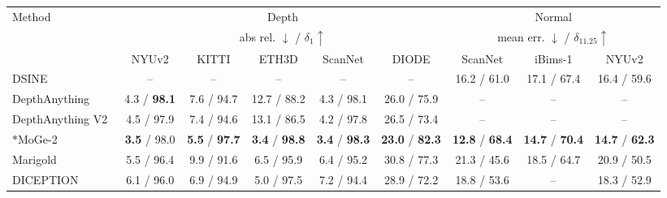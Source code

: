 \begin{table}[t]
    \centering
    \small
    \setlength{\tabcolsep}{3pt}
    \begin{tabular}{l|ccccc|ccc}
        \toprule
        \multirow{3}{*}{Method} & \multicolumn{5}{c|}{Depth} & \multicolumn{3}{c}{Normal} \\
        & \multicolumn{5}{c|}{abs rel. $\downarrow$ / $\delta_1 \uparrow$} & \multicolumn{3}{c}{mean err. $\downarrow$ / $\delta_{11.25} \uparrow$} \\
        \cmidrule(lr){2-6} \cmidrule(lr){7-9}
        & NYUv2 & KITTI & ETH3D & ScanNet & DIODE
        & ScanNet & iBims-1 & NYUv2 \\
        \midrule
        DSINE~\cite{bae2024dsine}                   & --                              & --                               & --                             & --                               & --                    & 16.2 / 61.0                         & 17.1 / 67.4                      & 16.4 / 59.6                        \\
        DepthAnything~\cite{depthanything}          & 4.3 / \textbf{98.1}              & 7.6 / 94.7                          & 12.7 / 88.2                        & 4.3 / 98.1                         & 26.0 / 75.9             & --                              & --                           & --                             \\
        DepthAnything V2~\cite{depthanythingv2}     & 4.5 / 97.9                        & 7.4 / 94.6                          & 13.1 / 86.5                        & 4.2 / 97.8                         & 26.5 / 73.4             & --                              & --                           & --                             \\
        $\ast$MoGe-2~\cite{wang2025moge2}          & \textbf{3.5} / 98.0& \textbf{5.5} / \textbf{97.7}& \textbf{3.4} / \textbf{98.8}& \textbf{3.4} / \textbf{98.3}& \textbf{23.0} / \textbf{82.3}& \textbf{12.8} / \textbf{68.4}& \textbf{14.7} / \textbf{70.4}& \textbf{14.7} / \textbf{62.3}\\
        \midrule
        Marigold~\cite{ke2024marigold}              & 5.5 / 96.4                        & 9.9 / 91.6                           & 6.5 / 95.9                         & 6.4 / 95.2                           & 30.8 / 77.3 & 21.3 / 45.6                         & 18.5 / 64.7                      & 20.9 / 50.5                        \\
        DICEPTION~\cite{diception}                  & 6.1 / 96.0                        & 6.9 / 94.9                           & 5.0 / 97.5                         & 7.2 / 94.4                           & 28.9 / 72.2             & 18.8 / 53.6                         & --                           & 18.3 / 52.9                        \\

\end{tabular}
\end{table}
